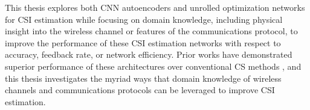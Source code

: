 This thesis explores both CNN autoencoders and unrolled optimization networks for CSI estimation while focusing on domain knowledge, including physical insight into the wireless channel or features of the communications protocol, to improve the performance of these CSI estimation networks with respect to accuracy, feedback rate, or network efficiency. Prior works have demonstrated superior performance of these architectures over conventional CS methods \cite{ref:csinet,ref:Guo2022FISTANet}, and this thesis investigates the myriad ways that domain knowledge of wireless channels and communications protocols can be leveraged to improve CSI estimation.

